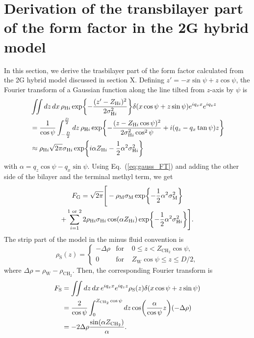 \documentclass[12pt,letterpaper]{article}
\newcommand{\dx}{\mathop{dx}}
\newcommand{\dz}{\mathop{dz}}
\newcommand{\zh}[1]{Z_{\mathrm{H}#1}}
\newcommand{\zw}{Z_\mathrm{W}}
\newcommand{\zchtwo}{Z_\mathrm{CH_2}}
\newcommand{\sigmah}[1]{\sigma_{\mathrm{H}#1}}
\newcommand{\sigmam}{\sigma_\mathrm{M}}
\newcommand{\rhoh}[1]{\rho_{\mathrm{H}#1}}
\newcommand{\rhom}{\rho_\mathrm{M}}
\newcommand{\rhos}{\rho_\mathrm{S}}
\newcommand{\rhow}{\rho_\mathrm{W}}
\newcommand{\rhochtwo}{\rho_\mathrm{CH_2}}
\begin{document}
\section{Derivation of the transbilayer part of the form factor in the 2G hybrid model}
In this section, we derive the trasbilayer part of the form factor calculated
from the 2G hybrid model discussed in section X.
Defining $z'=-x\sin\psi+z\cos\psi$, the Fourier transform of a Gaussian function 
along the line tilted from $z$-axis by $\psi$ is
\begin{align}
  & \iint\dz\dx \rhoh{i} \exp\braces{-\frac{(z'-\zh{i})^2}{2\sigmah{i}^2}}
  \delta(x\cos\psi+z\sin\psi)e^{iq_xx}e^{iq_zz} \nonumber\\
  &= \frac{1}{\cos\psi}\int_{-\frac{D}{2}}^{\frac{D}{2}}\dz \rhoh{i} \exp\braces{
    -\frac{(z-\zh{i}\cos\psi)^2}{2\sigmah{i}^2\cos^2\psi} + i(q_z-q_x\tan\psi)z
  } \nonumber \\
  &\approx \rhoh{i}\sqrt{2\pi}\sigmah{i} \,\mathrm{exp}
  \braces{
    i\alpha\zh{i} - \frac{1}{2}\alpha^2\sigmah{i}^2
  } \label{eq:gauss_FT}
\end{align}
with $\alpha=q_z\cos\psi-q_x\sin\psi$.
Using Eq.~(\ref{eq:gauss_FT}) and adding the other side of the bilayer and
the terminal methyl term, we get
\begin{multline}
  F_\mathrm{G} = \sqrt{2\pi}
  \Bigg[
    -\rhom\sigmam \exp\braces{
      -\frac{1}{2}\alpha^2\sigmam^2
    } \\
    + \sum_{i=1}^{1\text{ or }2}2\rhoh{i}\sigmah{i}
    \cos(\alpha\zh{i})
    \,\mathrm{exp}\braces{-\frac{1}{2}\alpha^2\sigmah{i}^2}
  \Bigg].
\end{multline}
The strip part of the 
model in the minus fluid convention is
\begin{equation}
  \rhos(z) = \left\{
    \begin{array}{ccc}
      -\Delta\rho & \text{for } & 0 \leq z < \zchtwo\cos\psi, \\
      0   & \text{for } & \zw\cos\psi \leq z \leq D/2,
    \end{array}
  \right.
\end{equation}
where $\Delta\rho=\rhow-\rhochtwo$.
Then, the corresponding Fourier transform is 
\begin{align}
  F_\mathrm{S} 
  &= \iint\dz\dx e^{iq_xx}e^{iq_zz} \rhos(z)\delta(x\cos\psi+z\sin\psi) \nonumber\\
  &= \frac{2}{\cos\psi} \int_0^{\zchtwo\cos\psi}\dz\cos\pars{\frac{\alpha}{\cos\psi} z}(-\Delta\rho) \nonumber\\
  &= -2\Delta\rho\frac{\sin(\alpha\zchtwo)}{\alpha}.
\end{align} 
\end{document}
